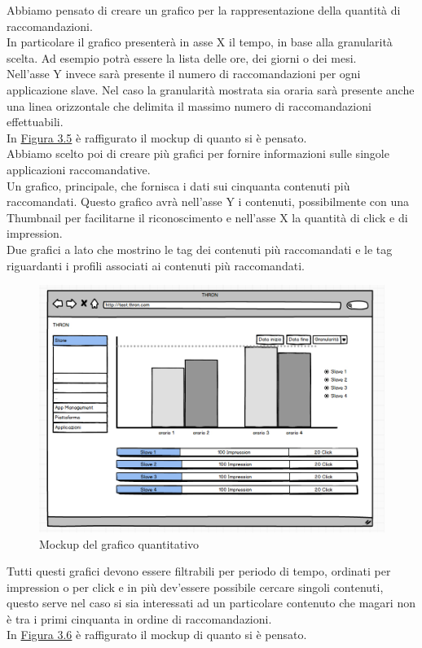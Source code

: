 \documentclass[a4paper, 12pt, twoside, openright]{book}
\begin{document}
Abbiamo pensato di creare un grafico per la rappresentazione della quantità di raccomandazioni.\\
In particolare il grafico presenterà in asse X il tempo, in base alla granularità scelta. Ad esempio potrà essere la lista delle ore, dei giorni o dei mesi.\\
Nell'asse Y invece sarà presente il numero di raccomandazioni per ogni applicazione slave. Nel caso la granularità mostrata sia oraria sarà presente anche una linea orizzontale che delimita il massimo numero di raccomandazioni effettuabili.\\
In \hyperref[grafico-quantitativo-mockup]{Figura 3.5} è raffigurato il mockup di quanto si è pensato.\\
Abbiamo scelto poi di creare più grafici per fornire informazioni sulle singole applicazioni raccomandative.\\
Un grafico, principale, che fornisca i dati sui cinquanta contenuti più raccomandati. Questo grafico avrà nell'asse Y i contenuti, possibilmente con una Thumbnail per facilitarne il riconoscimento e nell'asse X la quantità di click e di impression.\\
Due grafici a lato che mostrino le tag dei contenuti più raccomandati e le tag riguardanti i profili associati ai contenuti più raccomandati.\\

\begin{figure}[H]
	\centering
	\label{grafico-quantitativo-mockup}	\includegraphics[width=1.0\textwidth]{images/grafico-quantitativo-mockup.jpg}
	\caption{Mockup del grafico quantitativo}
\end{figure} 
Tutti questi grafici devono essere filtrabili per periodo di tempo, ordinati per impression o per click e in più dev'essere possibile cercare singoli contenuti, questo serve nel caso si sia interessati ad un particolare contenuto che magari non è tra i primi cinquanta in ordine di raccomandazioni.\\
In \hyperref[grafico-qualitativo-1-mockup]{Figura 3.6} è raffigurato il mockup di quanto si è pensato.\\
 
\end{document}
